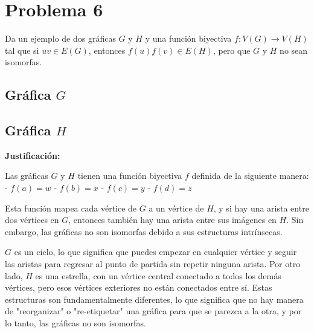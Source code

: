 \documentclass[12pt]{article}
\begin{document}
\begin{enumerate}
\begin{enumerate}
\end{enumerate}


\section*{Problema 6}
Da un ejemplo de dos gráficas \( G \) y \( H \) y una función biyectiva \( f: V(G) \rightarrow V(H) \) tal que si \( uv \in E(G) \), entonces \( f(u)f(v) \in E(H) \), pero que \( G \) y \( H \) no sean isomorfas.

\subsection*{Gráfica \( G \)}
\begin{center}
\end{center}

\subsection*{Gráfica \( H \)}
\begin{center}
\end{center}

\textbf{Justificación:}

Las gráficas \( G \) y \( H \) tienen una función biyectiva \( f \) definida de la siguiente manera:
- \( f(a) = w \)
- \( f(b) = x \)
- \( f(c) = y \)
- \( f(d) = z \)

Esta función mapea cada vértice de \( G \) a un vértice de \( H \), y si hay una arista entre dos vértices en \( G \), entonces también hay una arista entre sus imágenes en \( H \). Sin embargo, las gráficas no son isomorfas debido a sus estructuras intrínsecas.

\( G \) es un ciclo, lo que significa que puedes empezar en cualquier vértice y seguir las aristas para regresar al punto de partida sin repetir ninguna arista. Por otro lado, \( H \) es una estrella, con un vértice central conectado a todos los demás vértices, pero esos vértices exteriores no están conectados entre sí. Estas estructuras son fundamentalmente diferentes, lo que significa que no hay manera de "reorganizar" o "re-etiquetar" una gráfica para que se parezca a la otra, y por lo tanto, las gráficas no son isomorfas.
\end{document}

